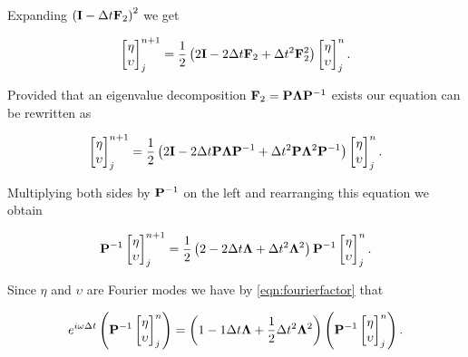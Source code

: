 Expanding $\left(\mathbf{I} - \Delta t\mathbf{F}_2 \right)^2$ we get

\begin{equation*}
\begin{bmatrix}
\eta \\ \upsilon
\end{bmatrix}^{n+1}_j = \frac{1}{2} \left(2\mathbf{I}  -2\Delta t\mathbf{F}_2 + \Delta t^2\mathbf{F}^2_2 \right) \begin{bmatrix}
\eta \\ \upsilon
\end{bmatrix}^{n}_j.
\end{equation*}

Provided that an eigenvalue decomposition $\mathbf{F}_2 = \mathbf{P} \mathbf{\Lambda} \mathbf{P}^{-1} $ exists our equation can be rewritten as 

\begin{equation*}
\begin{bmatrix}
\eta \\ \upsilon
\end{bmatrix}^{n+1}_j = \frac{1}{2} \left(2\mathbf{I}  -2\Delta t\mathbf{P} \mathbf{\Lambda} \mathbf{P}^{-1}  + \Delta t^2\mathbf{P} \mathbf{\Lambda}^2 \mathbf{P}^{-1} \right) \begin{bmatrix}
\eta \\ \upsilon
\end{bmatrix}^{n}_j.
\end{equation*}

Multiplying both sides by $\mathbf{P}^{-1}$ on the left and rearranging this equation we obtain

\begin{equation*}
\mathbf{P}^{-1} \begin{bmatrix}
\eta \\ \upsilon
\end{bmatrix}^{n+1}_j = \frac{1}{2} \left(2 -2\Delta t \mathbf{\Lambda}  + \Delta t^2 \mathbf{\Lambda}^2  \right)  \mathbf{P}^{-1} \begin{bmatrix}
\eta \\ \upsilon
\end{bmatrix}^{n}_j.
\end{equation*}

Since $\eta$ and $\upsilon$ are Fourier modes we have by \eqref{eqn:fourierfactor} that

\begin{equation*}
e^{i\omega \Delta t} \left(\mathbf{P}^{-1} \begin{bmatrix}
\eta \\ \upsilon
\end{bmatrix}^{n}_j  \right)= \left(1 -1\Delta t \mathbf{\Lambda}  + \frac{1}{2}\Delta t^2 \mathbf{\Lambda}^2  \right)  \left(\mathbf{P}^{-1} \begin{bmatrix}
\eta \\ \upsilon
\end{bmatrix}^{n}_j  \right).
\end{equation*}

